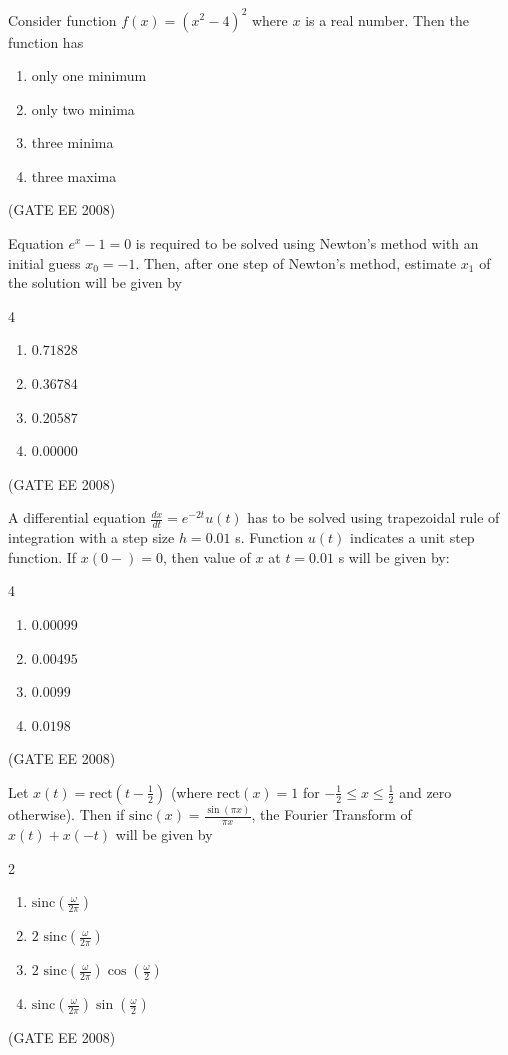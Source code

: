 \item Consider function $f(x)=(x^2-4)^2$ where $x$ is a real number. Then the function has

\begin{enumerate}
    \item only one minimum
    \item only two minima
    \item three minima
    \item three maxima
\end{enumerate}
\hfill (GATE EE 2008)



\item Equation $e^x - 1 = 0$ is required to be solved using Newton's method with an initial guess $x_0 = -1$. Then, after one step of Newton's method, estimate $x_1$ of the solution will be given by

\begin{multicols}{4}
\begin{enumerate}
    \item $0.71828$
    \item $0.36784$
    \item $0.20587$
    \item $0.00000$
\end{enumerate}
\end{multicols}
\hfill (GATE EE 2008)
\item A differential equation $\frac{dx}{dt} = e^{-2t}u(t)$ has to be solved using trapezoidal rule of integration with a step size $h=0.01$ s. Function $u(t)$ indicates a unit step function. If $x(0-) = 0$, then value of $x$ at $t=0.01$ s will be given by:

\begin{multicols}{4}
\begin{enumerate}
    \item $0.00099$
    \item $0.00495$
    \item $0.0099$
    \item $0.0198$
\end{enumerate}
\end{multicols}
\hfill (GATE EE 2008)
\item Let $x(t) = \text{rect}\left(t-\frac{1}{2}\right)$ (where $\text{rect}(x)=1$ for $-\frac{1}{2} \le x \le \frac{1}{2}$ and zero otherwise). Then if $\text{sinc}(x)=\frac{\sin(\pi x)}{\pi x}$, the Fourier Transform of $x(t)+x(-t)$ will be given by

\begin{multicols}{2}
\begin{enumerate}
    \item $\text{sinc}\left(\frac{\omega}{2\pi}\right)$
    \item $2 \text{ sinc}\left(\frac{\omega}{2\pi}\right)$
    \item $2 \text{ sinc}\left(\frac{\omega}{2\pi}\right)\cos\left(\frac{\omega}{2}\right)$
    \item $\text{sinc}\left(\frac{\omega}{2\pi}\right)\sin\left(\frac{\omega}{2}\right)$
\end{enumerate}
\end{multicols}
\hfill (GATE EE 2008)

